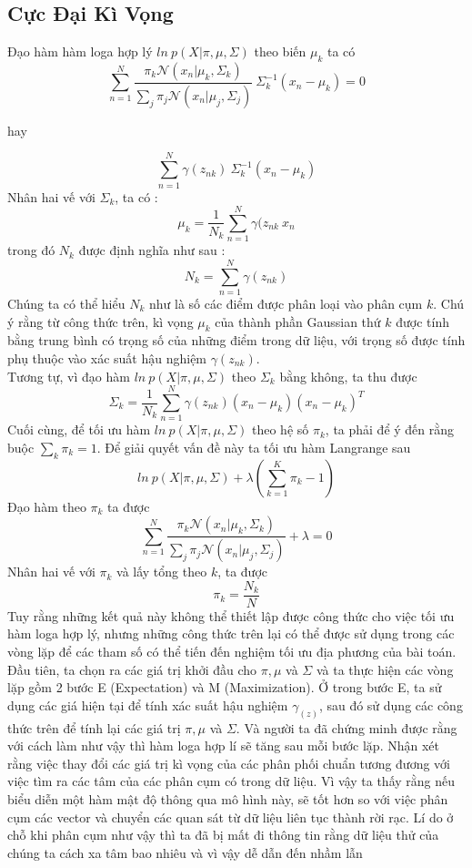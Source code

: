 \documentclass[13pt]{extreport}
\begin{document}
\subsection{Cực Đại Kì Vọng}
Đạo hàm hàm loga hợp lý $ln \ p(X| \pi, \mu, \Sigma)$ theo biến $\mu_k$ ta có
$$\sum_{n=1}^{N} \frac{\pi_k \mathcal{N}(x_n| \mu_k, \Sigma_k)}{\sum_j \pi_j \mathcal{N}(x_n | \mu_j, \Sigma_j)} \ \Sigma_{k}^{-1}(x_n - \mu_k) = 0 $$
\begin{center}
hay
\end{center}
$$\sum_{n=1}^{N} \gamma(z_{nk}) \ \Sigma_{k}^{-1}(x_n - \mu_k)$$
Nhân hai vế với $\Sigma_k$, ta có :
$$\mu_k = \frac{1}{N_k} \sum_{n=1}^{N} \gamma(z_{nk} \ x_n$$
trong đó $N_k$ được định nghĩa như sau :
$$N_k = \sum_{n=1}^{N} \gamma(z_{nk})$$
Chúng ta có thể hiểu $N_k$ như là số các điểm được phân loại vào phân cụm $k$. Chú ý rằng từ công thức trên, kì vọng $\mu_k$ của thành phần Gaussian thứ $k$ được tính bằng trung bình có trọng số của những điểm trong dữ liệu, với trọng số được tính phụ thuộc vào xác suất hậu nghiệm $\gamma(z_{nk})$. \\
Tương tự, vì đạo hàm $ln \ p(X| \pi, \mu, \Sigma)$ theo $\Sigma_k$ bằng không, ta thu được
$$\Sigma_k = \frac{1}{N_k} \sum_{n=1}^{N} \gamma(z_{nk})(x_n - \mu_k)(x_n - \mu_k)^T$$
Cuối cùng, để tối ưu hàm $ln \ p(X| \pi, \mu, \Sigma)$ theo hệ số $\pi_k$, ta phải để ý đến rằng buộc $\sum_k \pi_k = 1$. Để giải quyết vấn đề này ta tối ưu hàm Langrange sau
$$ln \ p(X| \pi, \mu, \Sigma) + \lambda (\sum_{k=1}^{K} \pi_k - 1)$$
Đạo hàm theo $\pi_k$ ta được
$$\sum_{n=1}^{N} \frac{\pi_k \mathcal{N}(x_n| \mu_k, \Sigma_k)}{\sum_j \pi_j \mathcal{N}(x_n | \mu_j, \Sigma_j)} + \lambda = 0$$
Nhân hai vế với $\pi_k$ và lấy tổng theo $k$, ta được
$$\pi_k = \frac{N_k}{N}$$
Tuy rằng những kết quả này không thể thiết lập được công thức cho việc tối ưu hàm loga hợp lý, nhưng những công thức trên lại có thể được sử dụng trong các vòng lặp để các tham số có thể tiến đến nghiệm tối ưu địa phương của bài toán.\\
Đầu tiên, ta chọn ra các giá trị khởi đầu cho $\pi, \mu$ và $\Sigma$ và ta thực hiện các vòng lặp gồm 2 bước E (Expectation) và M (Maximization). Ở trong bước E, ta sử dụng các giá hiện tại để tính xác suất hậu nghiệm $\gamma_(z)$, sau đó sử dụng các công thức trên để tính lại các giá trị $\pi, \mu$ và $\Sigma$. Và người ta đã chứng minh được rằng với cách làm như vậy thì hàm loga hợp lí sẽ tăng sau mỗi bước lặp. Nhận xét rằng việc thay đổi các giá trị kì vọng của các phân phối chuẩn tương đương với việc tìm ra các tâm của các phân cụm có trong dữ liệu. Vì vậy ta thấy rằng nếu biểu diễn một hàm mật độ thông qua mô hình này, sẽ tốt hơn so với việc phân cụm các vector và chuyển các quan sát từ dữ liệu liên tục thành rời rạc. Lí do ở chỗ khi phân cụm như vậy thì ta đã bị mất đi thông tin rằng dữ liệu thử của chúng ta cách xa tâm bao nhiêu và vì vậy dễ dẫn đến nhầm lẫn
\end{document}
